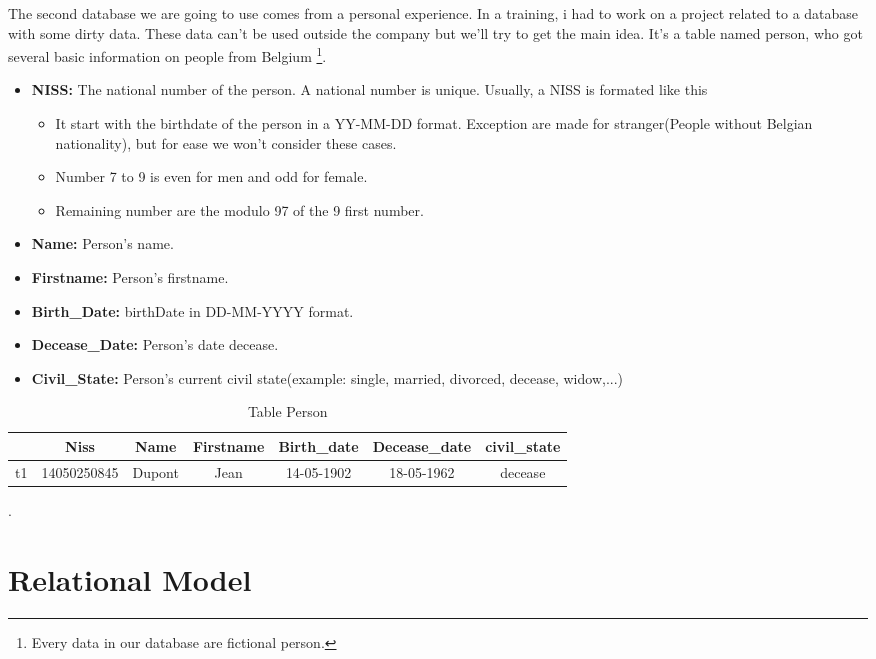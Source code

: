 \documentclass[letterpaper, 12pt]{report}
\begin{document}
The second database we are going to use comes from a personal experience. In a training, i had to work on a project related to a database with some dirty data. These data can't be used outside the company but we'll try to get the main idea. It's a table named person, who got several basic information on people from Belgium \footnote{Every data in our database are fictional person.}.
\begin{itemize}
\item \textbf{NISS:} The national number of the person. A national number is unique. Usually, a NISS is formated like this\cite{bcss}
	\begin{itemize}
	\item It start with the birthdate of the person in a YY-MM-DD format. Exception are made for stranger(People without Belgian nationality), but for ease we won't consider these cases.
	\item Number 7 to 9 is even for men and odd for female.
	\item Remaining number are the modulo 97 of the 9 first number. 
	\end{itemize}
\item \textbf{Name:} Person's name.
\item \textbf{Firstname:} Person's firstname.
\item \textbf{Birth\_Date:} birthDate in DD-MM-YYYY format.
\item \textbf{Decease\_Date:} Person's date decease.
\item \textbf{Civil\_State:} Person's current civil state(example: single, married, divorced, decease, widow,...)
\end{itemize}

\begin{table}[H]
	\centering
	\begin{tabular}{|c|c c c c c c|}
	\hline
	    & Niss & Name & Firstname & Birth\_date & Decease\_date & civil\_state\\
	\hline
	 t1 & 14050250845 & Dupont & Jean & 14-05-1902 & 18-05-1962 & decease \\
	\hline
	 
	 \hline
	\end{tabular}
	\caption{\label{tableMain} Table Person}.
\end{table}

\section{Relational Model}
\end{document}
